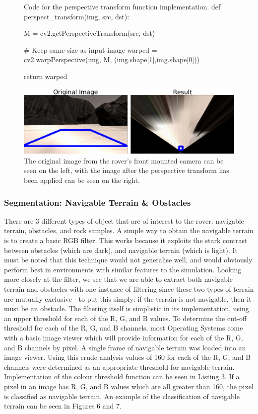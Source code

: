 \documentclass[a4paper]{article}
\begin{document}
\begin{figure}[h]\scriptsize
\begin{sexylisting}{Code for the perspective transform function implementation.}
def perspect_transform(img, src, dst):
           
    M = cv2.getPerspectiveTransform(src, dst)
    
    # Keep same size as input image
    warped = cv2.warpPerspective(img, M, (img.shape[1],img.shape[0]))
    
    return warped
\end{sexylisting}
\end{figure}

\begin{figure}[H]
	\centering
	\includegraphics[scale=0.3]{image4}
	\caption{The original image from the rover's front mounted camera can be seen on the left, with the image after the perspective transform has been applied can be seen on the right.}
\end{figure}

\subsubsection{Segmentation: Navigable Terrain \& Obstacles}
There are 3 different types of object that are of interest to the rover: navigable terrain, obstacles, and rock samples. A simple way to obtain the navigable terrain is to create a basic RGB filter. This works because it exploits the stark contrast between obstacles (which are dark), and navigable terrain (which is light). It must be noted that this technique would not generalise well, and would obviously perform best in environments with similar features to the simulation. Looking more closely at the filter, we see that we are able to extract both navigable terrain and obstacles with one instance of filtering since these two types of terrain are mutually exclusive - to put this simply: if the terrain is not navigable, then it must be an obstacle. The filtering itself is simplistic in its implementation, using an upper threshold for each of the R, G, and B values. To determine the cut-off threshold for each of the R, G, and B channels, most Operating Systems come with a basic image viewer which will provide information for each of the R, G, and B channels by pixel. A single frame of navigable terrain was loaded into an image viewer. Using this crude analysis values of 160 for each of the R, G, and B channels were determined as an appropriate threshold for navigable terrain. Implementation of the colour threshold function can be seen in Listing 3. If a pixel in an image has R, G, and B values which are all greater than 160, the pixel is classified as navigable terrain. An example of the classification of navigable terrain can be seen in Figures 6 and 7.
\end{document}
